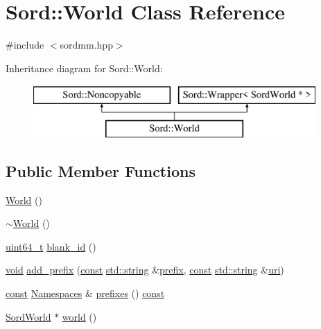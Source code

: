 \hypertarget{class_sord_1_1_world}{}\section{Sord\+:\+:World Class Reference}
\label{class_sord_1_1_world}


{\ttfamily \#include $<$sordmm.\+hpp$>$}

Inheritance diagram for Sord\+:\+:World\+:\begin{figure}[H]
\begin{center}
\leavevmode
\includegraphics[height=2.000000cm]{class_sord_1_1_world}
\end{center}
\end{figure}
\subsection*{Public Member Functions}
\begin{DoxyCompactItemize}
\item 
\hyperlink{class_sord_1_1_world_a6f5b682eaa175d81d50ccc6cd6749cc6}{World} ()
\item 
\hyperlink{class_sord_1_1_world_a32e54c905975600bc8f4dfaa269e7ecd}{$\sim$\+World} ()
\item 
\hyperlink{lib-src_2ffmpeg_2win32_2stdint_8h_aec6fcb673ff035718c238c8c9d544c47}{uint64\+\_\+t} \hyperlink{class_sord_1_1_world_a786fd677733b7ea9ba90f3774c459305}{blank\+\_\+id} ()
\item 
\hyperlink{sound_8c_ae35f5844602719cf66324f4de2a658b3}{void} \hyperlink{class_sord_1_1_world_a9e00a97aa04da135434b044b49c6df8d}{add\+\_\+prefix} (\hyperlink{getopt1_8c_a2c212835823e3c54a8ab6d95c652660e}{const} \hyperlink{test__lib_f_l_a_c_2format_8c_ab02026ad0de9fb6c1b4233deb0a00c75}{std\+::string} \&\hyperlink{structprefix}{prefix}, \hyperlink{getopt1_8c_a2c212835823e3c54a8ab6d95c652660e}{const} \hyperlink{test__lib_f_l_a_c_2format_8c_ab02026ad0de9fb6c1b4233deb0a00c75}{std\+::string} \&\hyperlink{lib_2expat_8h_a5a9fdd6c2606370ad12f24c078ac6585}{uri})
\item 
\hyperlink{getopt1_8c_a2c212835823e3c54a8ab6d95c652660e}{const} \hyperlink{class_sord_1_1_namespaces}{Namespaces} \& \hyperlink{class_sord_1_1_world_a633b7f66f1772a5562aacc51505ac80b}{prefixes} () \hyperlink{getopt1_8c_a2c212835823e3c54a8ab6d95c652660e}{const} 
\item 
\hyperlink{group__sord_ga133d918ec58f829198b2cf65f250ed69}{Sord\+World} $\ast$ \hyperlink{class_sord_1_1_world_ac20cc1f0b4ac4a6e2f936cc9a9821ec8}{world} ()
\end{DoxyCompactItemize}
